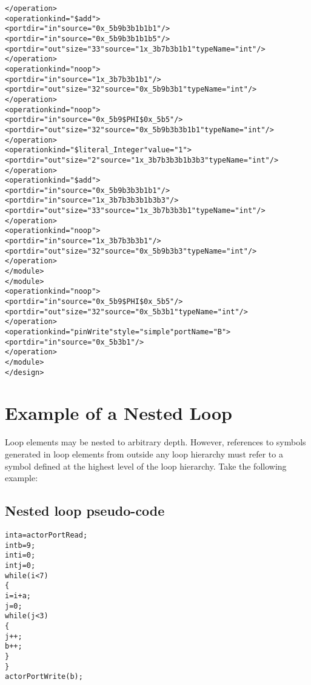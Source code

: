 \begin{alltt}
        </operation>
        <operation kind="\$add">
          <port dir="in" source="0x\_5b9b3b1b1b1"/>
          <port dir="in" source="0x\_5b9b3b1b1b5"/>
          <port dir="out" size="33" source="1x\_3b7b3b1b1" typeName="int"/>
        </operation>
        <operation kind="noop">
          <port dir="in" source="1x\_3b7b3b1b1"/>
          <port dir="out" size="32" source="0x\_5b9b3b1" typeName="int"/>
        </operation>
        <operation kind="noop">
          <port dir="in" source="0x\_5b9\$PHI\$0x\_5b5"/>
          <port dir="out" size="32" source="0x\_5b9b3b3b1b1" typeName="int"/>
        </operation>
        <operation kind="\$literal\_Integer" value="1">
          <port dir="out" size="2" source="1x\_3b7b3b3b1b3b3" typeName="int"/>
        </operation>
        <operation kind="\$add">
          <port dir="in" source="0x\_5b9b3b3b1b1"/>
          <port dir="in" source="1x\_3b7b3b3b1b3b3"/>
          <port dir="out" size="33" source="1x\_3b7b3b3b1" typeName="int"/>
        </operation>
        <operation kind="noop">
          <port dir="in" source="1x\_3b7b3b3b1"/>
          <port dir="out" size="32" source="0x\_5b9b3b3" typeName="int"/>
        </operation>
      </module>
    </module>
    <operation kind="noop">
      <port dir="in" source="0x\_5b9\$PHI\$0x\_5b5"/>
      <port dir="out" size="32" source="0x\_5b3b1" typeName="int"/>
    </operation>
    <operation kind="pinWrite" style="simple" portName="B">
      <port dir="in" source="0x\_5b3b1"/>
    </operation>
  </module>
</design>

\end{alltt}


\section{Example of a Nested Loop}

Loop elements may be nested to arbitrary depth.  However, references
to symbols generated in loop elements from outside any loop hierarchy
must refer to a symbol defined at the highest level of the loop
hierarchy.  Take the following example:

\subsection{Nested loop pseudo-code}
\begin{alltt}
int a = actorPortRead;
int b = 9;
int i = 0;
int j = 0;
while ( i < 7 )
\{
  i = i + a;
  j = 0;
  while (j < 3)
  \{
    j++;
    b++;
  \}
\}
actorPortWrite(b);
\end{alltt}

